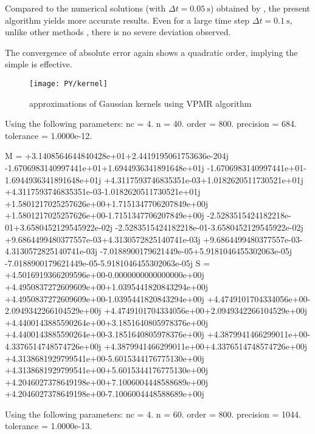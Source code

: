 Compared to the numerical solutions (with $\Delta{}t=\SI{0.05}{\second}$) obtained by \citet{Cortes2009}, the present algorithm yields more accurate results. Even for a large time step $\Delta{}t=\SI{0.1}{\second}$, unlike other methods \citep{Liu2023}, there is no severe deviation observed.

The convergence of absolute error again shows a quadratic order, implying the simple  is effective.


\begin{figure}[H]
\centering
\texttt{[image: PY/kernel]}
\caption{approximations of Gaussian kernels using VPMR algorithm}\label{fig:vpmr}
\end{figure}

Using the following parameters:
        nc = 4.
         n = 40.
     order = 800.
 precision = 684.
 tolerance = 1.0000e-12.

M =
+3.1408564644840428e+01+2.4419195061753636e-204j
-1.6706983140997441e+01+1.6944936341891648e+01j
-1.6706983140997441e+01-1.6944936341891648e+01j
+4.3117593746835351e-03+1.0182620511730521e+01j
+4.3117593746835351e-03-1.0182620511730521e+01j
+1.5801217025257626e+00+1.7151347706207849e+00j
+1.5801217025257626e+00-1.7151347706207849e+00j
-2.5283515424182218e-01+3.6580452129545922e-02j
-2.5283515424182218e-01-3.6580452129545922e-02j
+9.6864499480377557e-03+4.3130572825140741e-03j
+9.6864499480377557e-03-4.3130572825140741e-03j
-7.0188900179621449e-05+5.9181046455302063e-05j
-7.0188900179621449e-05-5.9181046455302063e-05j
S =
+4.5016919366209596e+00-0.0000000000000000e+00j
+4.4950837272609609e+00+1.0395441820843294e+00j
+4.4950837272609609e+00-1.0395441820843294e+00j
+4.4749101704334056e+00-2.0949342266104529e+00j
+4.4749101704334056e+00+2.0949342266104529e+00j
+4.4400143885590264e+00+3.1851640805978376e+00j
+4.4400143885590264e+00-3.1851640805978376e+00j
+4.3879941466299011e+00-4.3376514748574726e+00j
+4.3879941466299011e+00+4.3376514748574726e+00j
+4.3138681929799541e+00-5.6015344176775130e+00j
+4.3138681929799541e+00+5.6015344176775130e+00j
+4.2046027378649198e+00+7.1006004448588689e+00j
+4.2046027378649198e+00-7.1006004448588689e+00j


Using the following parameters:
        nc = 4.
         n = 60.
     order = 800.
 precision = 1044.
 tolerance = 1.0000e-13.

